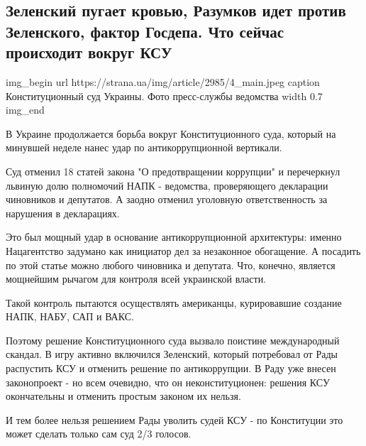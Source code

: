  
 
 

\subsection{Зеленский пугает кровью, Разумков идет против Зеленского, фактор Госдепа. Что сейчас происходит вокруг КСУ}


\ifcmt
img_begin 
	url https://strana.ua/img/article/2985/4_main.jpeg
	caption Конституционный суд Украины. Фото пресс-службы ведомства 
	width 0.7
img_end
\fi

В Украине продолжается борьба вокруг Конституционного суда, который на минувшей
неделе нанес удар по антикоррупционной вертикали.

Суд отменил 18 статей закона "О предотвращении коррупции" и перечеркнул львиную
долю полномочий НАПК - ведомства, проверяющего декларации чиновников и
депутатов. А заодно отменил уголовную ответственность за нарушения в
декларациях. 

Это был мощный удар в основание антикоррупционной архитектуры: именно
Нацагентство задумано как инициатор дел за незаконное обогащение. А посадить по
этой статье можно любого чиновника и депутата. Что, конечно, является мощнейшим
рычагом для контроля всей украинской власти.

Такой контроль пытаются осуществлять американцы, курировавшие создание НАПК,
НАБУ, САП и ВАКС. 

Поэтому решение Конституционного суда вызвало поистине международный скандал. В
игру активно включился Зеленский, который потребовал от Рады распустить КСУ и
отменить решение по антикоррупции. В Раду уже внесен законопроект - но всем
очевидно, что он неконституционен: решения КСУ окончательны и отменить простым
законом их нельзя.

И тем более нельзя решением Рады уволить судей КСУ - по Конституции это может
сделать только сам суд 2/3 голосов.

